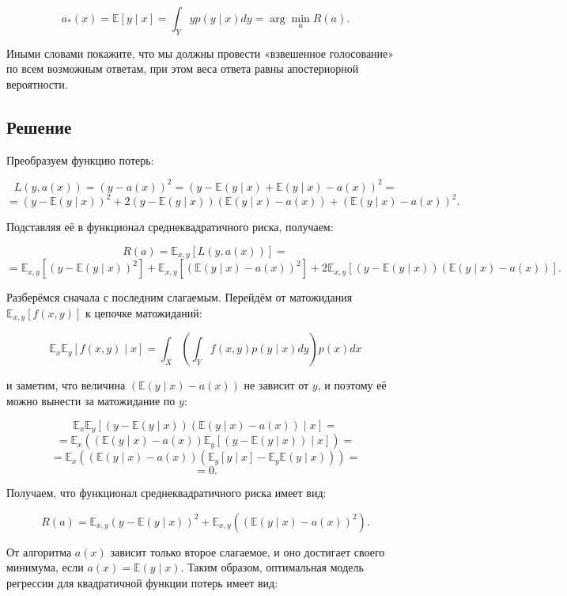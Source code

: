 \[
a_*(x) = \mathbb{E}[y \mid x] = \int_Y y p(y \mid x) dy = \arg \min_a R(a).
\]

Иными словами покажите, что мы должны провести «взвешенное голосование» по всем возможным ответам, при этом веса ответа равны апостериорной вероятности.

\subsection*{Решение}

Преобразуем функцию потерь:

\[
L(y, a(x)) = (y - a(x))^2 = (y - \mathbb{E}(y \mid x) + \mathbb{E}(y \mid x) - a(x))^2 =
\]
\[
= (y - \mathbb{E}(y \mid x))^2 + 2(y - \mathbb{E}(y \mid x))(\mathbb{E}(y \mid x) - a(x)) + (\mathbb{E}(y \mid x) - a(x))^2.
\]

Подставляя её в функционал среднеквадратичного риска, получаем:

\[
R(a) = \mathbb{E}_{x,y}[L(y, a(x))] =
\]
\[
= \mathbb{E}_{x,y}[(y - \mathbb{E}(y \mid x))^2] + \mathbb{E}_{x,y}[(\mathbb{E}(y \mid x) - a(x))^2] +
2 \mathbb{E}_{x,y}[(y - \mathbb{E}(y \mid x))(\mathbb{E}(y \mid x) - a(x))].
\]

Разберёмся сначала с последним слагаемым. Перейдём от матожидания \(\mathbb{E}_{x,y}[f(x, y)]\) к цепочке матожиданий:

\[
\mathbb{E}_x \mathbb{E}_y[f(x, y) \mid x] = \int_X \left( \int_Y f(x, y) p(y \mid x) dy \right) p(x) dx
\]

и заметим, что величина \((\mathbb{E}(y \mid x) - a(x))\) не зависит от \(y\), и поэтому её можно вынести за матожидание по \(y\):

\[
\mathbb{E}_x \mathbb{E}_y \left[ (y - \mathbb{E}(y \mid x))(\mathbb{E}(y \mid x) - a(x)) \mid x \right] =
\]
\[
= \mathbb{E}_x \left( (\mathbb{E}(y \mid x) - a(x)) \mathbb{E}_y \left[ (y - \mathbb{E}(y \mid x)) \mid x \right] \right) =
\]
\[
= \mathbb{E}_x \left( (\mathbb{E}(y \mid x) - a(x)) (\mathbb{E}_y[y \mid x] - \mathbb{E}_y \mathbb{E}(y \mid x)) \right) =
\]
\[
= 0.
\]

Получаем, что функционал среднеквадратичного риска имеет вид:

\[
R(a) = \mathbb{E}_{x,y}(y - \mathbb{E}(y \mid x))^2 + \mathbb{E}_{x,y}((\mathbb{E}(y \mid x) - a(x))^2).
\]

От алгоритма \(a(x)\) зависит только второе слагаемое, и оно достигает своего минимума, если \(a(x) = \mathbb{E}(y \mid x)\). Таким образом, оптимальная модель регрессии для квадратичной функции потерь имеет вид:

